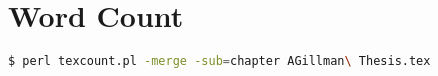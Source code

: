 %

\chapter*{Word Count}

%

\begin{lstlisting}[language=bash]
$ perl texcount.pl -merge -sub=chapter AGillman\ Thesis.tex
\end{lstlisting}


%
%

